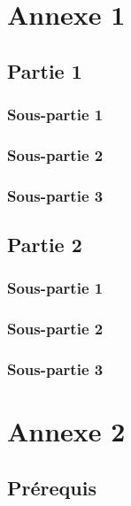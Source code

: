 \appendix

\section{Annexe 1}
\label{sec:annexe1}

\subsection{Partie 1}
\label{ssec:annexe1_partie1}
\subsubsection{Sous-partie 1}
\label{sssec:annexe1_partie1_sous1}
\subsubsection{Sous-partie 2}
\label{sssec:annexe1_partie1_sous2}
\subsubsection{Sous-partie 3}
\label{sssec:annexe1_partie1_sous3}

\subsection{Partie 2}
\label{ssec:annexe1_partie2}
\subsubsection{Sous-partie 1}
\label{sssec:annexe1_partie2_sous1}
\subsubsection{Sous-partie 2}
\label{sssec:annexe1_partie2_sous2}
\subsubsection{Sous-partie 3}
\label{sssec:annexe1_partie2_sous3}

\section{Annexe 2}
\label{sec:annexe2}
\subsection{Prérequis}
\label{ssec:annexe2_prerequis}
